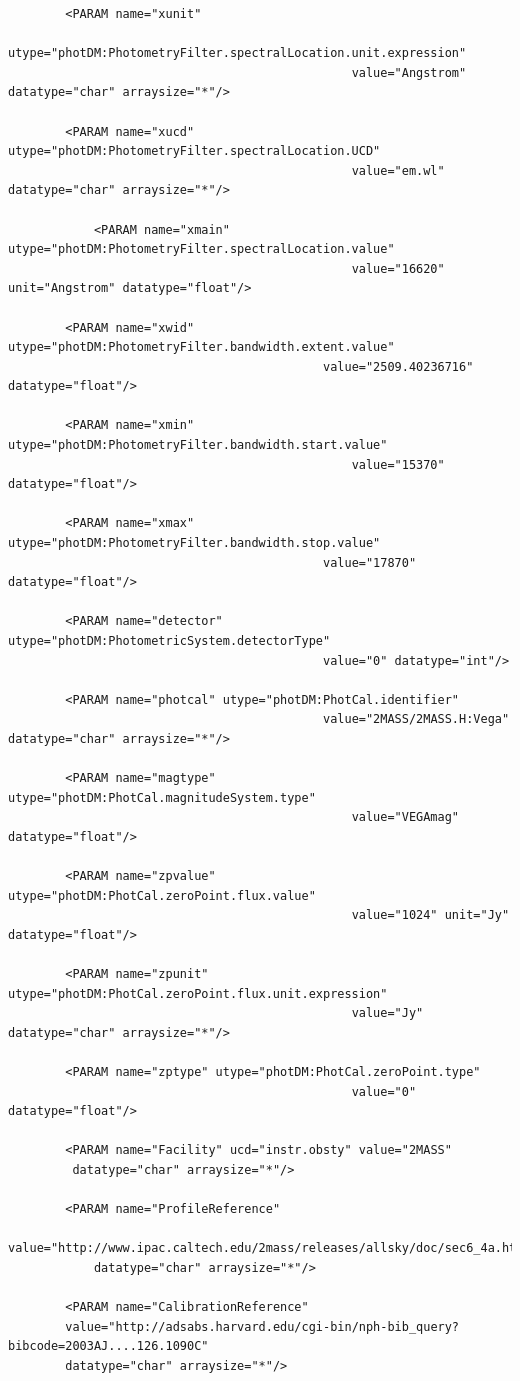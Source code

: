 \documentclass[11pt,a4paper]{ivoa}
\begin{document}
\begin{appendices}
\begin{verbatim}
        <PARAM name="xunit"
        	utype="photDM:PhotometryFilter.spectralLocation.unit.expression"
        										value="Angstrom" datatype="char" arraysize="*"/>

        <PARAM name="xucd"  	utype="photDM:PhotometryFilter.spectralLocation.UCD"
        										value="em.wl" datatype="char" arraysize="*"/>

    		<PARAM name="xmain" 	utype="photDM:PhotometryFilter.spectralLocation.value"
    											value="16620" unit="Angstrom" datatype="float"/>

		<PARAM name="xwid"	utype="photDM:PhotometryFilter.bandwidth.extent.value"
											value="2509.40236716" datatype="float"/>

        <PARAM name="xmin"  utype="photDM:PhotometryFilter.bandwidth.start.value"
        										value="15370" datatype="float"/>

   		<PARAM name="xmax"  utype="photDM:PhotometryFilter.bandwidth.stop.value"
   											value="17870" datatype="float"/>

		<PARAM name="detector" utype="photDM:PhotometricSystem.detectorType"
											value="0" datatype="int"/>

		<PARAM name="photcal" utype="photDM:PhotCal.identifier"
											value="2MASS/2MASS.H:Vega" datatype="char" arraysize="*"/>

        <PARAM name="magtype" utype="photDM:PhotCal.magnitudeSystem.type"
        										value="VEGAmag" datatype="float"/>

        <PARAM name="zpvalue" utype="photDM:PhotCal.zeroPoint.flux.value"
        										value="1024" unit="Jy" datatype="float"/>

        <PARAM name="zpunit" utype="photDM:PhotCal.zeroPoint.flux.unit.expression"
        										value="Jy" datatype="char" arraysize="*"/>

        <PARAM name="zptype" utype="photDM:PhotCal.zeroPoint.type"
        										value="0" datatype="float"/>

        <PARAM name="Facility" ucd="instr.obsty" value="2MASS"
         datatype="char" arraysize="*"/>

        <PARAM name="ProfileReference"
        value="http://www.ipac.caltech.edu/2mass/releases/allsky/doc/sec6_4a.html"
        	datatype="char" arraysize="*"/>

        <PARAM name="CalibrationReference"
        value="http://adsabs.harvard.edu/cgi-bin/nph-bib_query?bibcode=2003AJ....126.1090C"
        datatype="char" arraysize="*"/>



\end{verbatim}
\end{appendices}
\end{document}
